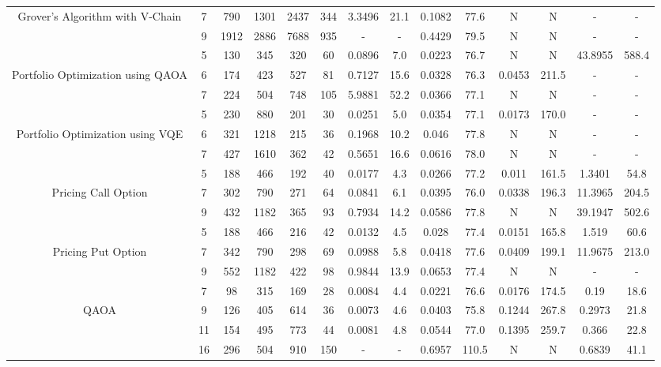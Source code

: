 \begin{table}[htb]
{\begin{tabular}{|c|c|c|c|c|c|c|c|c|c|c|c|c|c|}
 \\
Grover's Algorithm with V-Chain & 
7 & 790 & 1301 & 2437 & 344
 & 3.3496 & 21.1
 & 0.1082 & 77.6
 & N & N 
 & - & -
 \\
 & 
9 & 1912 & 2886 & 7688 & 935
 & - & -
 & 0.4429 & 79.5
 & N & N 
 & - & -
 \\
\hline
 & 
5 & 130 & 345 & 320 & 60
 & 0.0896 & 7.0
 & 0.0223 & 76.7
 & N & N 
 & 43.8955 & 588.4
 \\
Portfolio Optimization using QAOA & 
6 & 174 & 423 & 527 & 81
 & 0.7127 & 15.6
 & 0.0328 & 76.3
 & 0.0453 & 211.5
 & - & -
 \\
 & 
7 & 224 & 504 & 748 & 105
 & 5.9881 & 52.2
 & 0.0366 & 77.1
 & N & N 
 & - & -
 \\
\hline
 & 
5 & 230 & 880 & 201 & 30
 & 0.0251 & 5.0
 & 0.0354 & 77.1
 & 0.0173 & 170.0
 & - & -
 \\
Portfolio Optimization using VQE & 
6 & 321 & 1218 & 215 & 36
 & 0.1968 & 10.2
 & 0.046 & 77.8
 & N & N 
 & - & -
 \\
 & 
7 & 427 & 1610 & 362 & 42
 & 0.5651 & 16.6
 & 0.0616 & 78.0
 & N & N 
 & - & -
 \\
\hline
 & 
5 & 188 & 466 & 192 & 40
 & 0.0177 & 4.3
 & 0.0266 & 77.2
 & 0.011 & 161.5
 & 1.3401 & 54.8
 \\
Pricing Call Option & 
7 & 302 & 790 & 271 & 64
 & 0.0841 & 6.1
 & 0.0395 & 76.0
 & 0.0338 & 196.3
 & 11.3965 & 204.5
 \\
 & 
9 & 432 & 1182 & 365 & 93
 & 0.7934 & 14.2
 & 0.0586 & 77.8
 & N & N 
 & 39.1947 & 502.6
 \\
\hline
 & 
5 & 188 & 466 & 216 & 42
 & 0.0132 & 4.5
 & 0.028 & 77.4
 & 0.0151 & 165.8
 & 1.519 & 60.6
 \\
Pricing Put Option & 
7 & 342 & 790 & 298 & 69
 & 0.0988 & 5.8
 & 0.0418 & 77.6
 & 0.0409 & 199.1
 & 11.9675 & 213.0
 \\
 & 
9 & 552 & 1182 & 422 & 98
 & 0.9844 & 13.9
 & 0.0653 & 77.4
 & N & N 
 & - & -
 \\
\hline
 & 
7 & 98 & 315 & 169 & 28
 & 0.0084 & 4.4
 & 0.0221 & 76.6
 & 0.0176 & 174.5
 & 0.19 & 18.6
 \\
QAOA & 
9 & 126 & 405 & 614 & 36
 & 0.0073 & 4.6
 & 0.0403 & 75.8
 & 0.1244 & 267.8
 & 0.2973 & 21.8
 \\
 & 
11 & 154 & 495 & 773 & 44
 & 0.0081 & 4.8
 & 0.0544 & 77.0
 & 0.1395 & 259.7
 & 0.366 & 22.8
 \\
\hline
 & 
16 & 296 & 504 & 910 & 150
 & - & -
 & 0.6957 & 110.5
 & N & N 
 & 0.6839 & 41.1
 \\

\end{tabular}}
\end{table}
